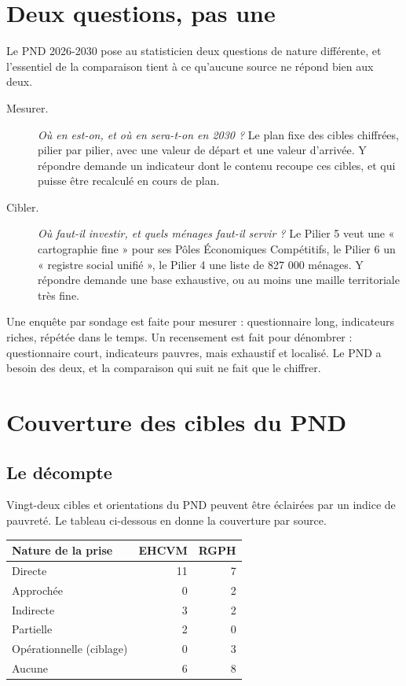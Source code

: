 \documentclass[11pt,a4paper]{article}
\begin{document}
\section{Deux questions, pas une}

Le PND 2026-2030 pose au statisticien deux questions de nature différente, et l'essentiel de la
comparaison tient à ce qu'aucune source ne répond bien aux deux.

\begin{description}
  \item[Mesurer.] \emph{Où en est-on, et où en sera-t-on en 2030 ?} Le plan fixe des cibles
    chiffrées, pilier par pilier, avec une valeur de départ et une valeur d'arrivée. Y répondre
    demande un indicateur dont le contenu recoupe ces cibles, et qui puisse être recalculé en cours
    de plan.
  \item[Cibler.] \emph{Où faut-il investir, et quels ménages faut-il servir ?} Le Pilier 5 veut
    une « cartographie fine » pour ses Pôles Économiques Compétitifs, le Pilier 6 un « registre
    social unifié », le Pilier 4 une liste de 827 000 ménages. Y répondre demande une base
    exhaustive, ou au moins une maille territoriale très fine.
\end{description}

\begin{retenir}
Une enquête par sondage est faite pour mesurer : questionnaire long, indicateurs riches, répétée
dans le temps. Un recensement est fait pour dénombrer : questionnaire court, indicateurs pauvres,
mais exhaustif et localisé. Le PND a besoin des deux, et la comparaison qui suit ne fait que le
chiffrer.
\end{retenir}

\section{Couverture des cibles du PND}

\subsection{Le décompte}

Vingt-deux cibles et orientations du PND peuvent être éclairées par un indice de pauvreté. Le
tableau ci-dessous en donne la couverture par source.

\begin{center}
\begin{tabular}{@{}lrr@{}}
\toprule
\textbf{Nature de la prise} & \textbf{EHCVM} & \textbf{RGPH} \\
\midrule
Directe & 11 & 7 \\
Approchée & 0 & 2 \\
Indirecte & 3 & 2 \\
Partielle & 2 & 0 \\
Opérationnelle (ciblage) & 0 & 3 \\
Aucune & 6 & 8 \\
\bottomrule
\end{tabular}
\end{center}
\end{document}
